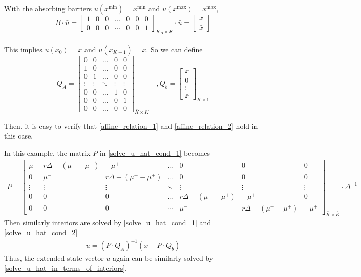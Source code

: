 \documentclass[11pt]{article}
\begin{document}
With the absorbing barriers $u(x^{\min}) = x^{\min}$ and $u(x^{\max}) = x^{\max}$,
\begin{equation}
B\cdot\bar{u} =\begin{bmatrix}
1&0&0&\dots&0&0&0\\
0&0&0&\cdots&0&0&1
\end{bmatrix}_{K_B\times \bar{K}}\cdot\bar{u} = \begin{bmatrix}
\underline{\textit{\~{x}}}\\
\bar{\textit{\~{x}}}
\end{bmatrix}
\end{equation}\\
This implies $u(x_0) = \underline{\textit{\~{x}}}$ and $u(x_{K+1}) = \bar{\textit{\~{x}}}$. So we can define
\begin{equation}
Q_A = \begin{bmatrix}
0& 0&\dots&0&0\\
1&0&\dots&0&0\\
0&1&\dots&0&0\\
\vdots&\vdots&\ddots&\vdots&\vdots\\
0&0&\dots&1&0\\
0&0&\dots&0&1\\
0&0&\dots&0&0
\end{bmatrix}_{\bar{K}\times K}\quad , Q_b = \begin{bmatrix}
\underline{\textit{\~{x}}}\\
0\\
\vdots\\
\bar{\textit{\~{x}}}
\end{bmatrix}_{\bar{K}\times 1}
\end{equation}

Then, it is easy to verify that \eqref{affine_relation_1} and \eqref{affine_relation_2} hold in this case.

In this example, the matrix $P$ in \eqref{solve_u_hat_cond_1} becomes
\begin{align}
P = \begin{bmatrix}
\mu^-&r\Delta-(\mu^--\mu^+)&-\mu^+&\dots&0&0&0\\
0&\mu^-&r\Delta-(\mu^--\mu^+)&\dots&0&0&0\\
\vdots&\vdots&\vdots&\ddots&\vdots&\vdots&\vdots\\
0&0&0&\dots&r\Delta-(\mu^--\mu^+)&-\mu^+&0\\
0&0&0&\cdots&\mu^-&r\Delta-(\mu^--\mu^+)&-\mu^+
\end{bmatrix}_{\bar{K}\times\bar{K}}\cdot \Delta^{-1}
\end{align}
Then similarly interiors are solved by \eqref{solve_u_hat_cond_1} and \eqref{solve_u_hat_cond_2}
\begin{align}
u = (P\cdot Q_A)^{-1}(x-P\cdot Q_b)
\end{align}
Thus, the extended state vector $\bar{u}$ again can be similarly solved by \eqref{solve_u_hat_in_terms_of_interiors}.
\end{document}
